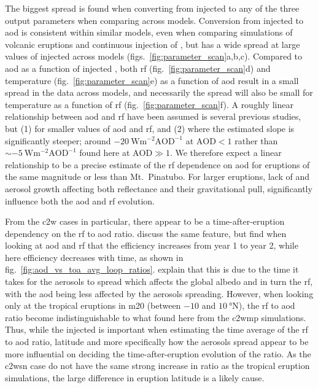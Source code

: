 \documentclass{ametsocV6.1}
\newcommand{\iso}[1][i]{{#1}njected \ce{SO2}}
\begin{document}
The biggest spread is found when converting from \iso{} to any of the three output
parameters when comparing across models. Conversion from \iso{} to \gls{aod} is
consistent within similar models, even when comparing simulations of volcanic eruptions
\citep{timmreck2010} and continuous injection of  \citep{niemeier2015}, but has
a wide spread at large values of \iso{} across models
(figs.~\ref{fig:parameter_scan}a,b,c). Compared to \gls{aod} as a function of \iso{},
both \gls{rf} (fig.~\ref{fig:parameter_scan}d) and temperature
(fig.~\ref{fig:parameter_scan}e) as a function of \gls{aod} result in a small spread in
the data across models, and necessarily the spread will also be small for temperature as
a function of \gls{rf} (fig.~\ref{fig:parameter_scan}f). A roughly linear relationship
between \gls{aod} and \gls{rf} have been assumed is several previous studies, but (1)
for smaller values of \gls{aod} and \gls{rf}, and (2) where the estimated slope is
significantly steeper; around \(\SI{-20}{\watt\metre^{-2}\mathrm{AOD}^{-1}}\) at
\(\mathrm{AOD}<1\) rather than \(\sim\SI{-5}{\watt\metre^{-2}\mathrm{AOD}^{-1}}\) found
here at \(\mathrm{AOD}\gg1\). We therefore expect a linear relationship to be a precise
estimate of the \gls{rf} dependence on \gls{aod} for eruptions of the same magnitude or
less than Mt.\ Pinatubo. For larger eruptions, lack of  and aerosol growth
affecting both reflectance and their gravitational pull, significantly influence both
the \gls{aod} and \gls{rf} evolution.

From the \gls{c2w} cases in particular, there appear to be a time-after-eruption
dependency on the \gls{rf} to \gls{aod} ratio. \citet{marshall2020} discuss the same
feature, but find when looking at \gls{aod} and \gls{rf} that the efficiency increases
from year 1 to year 2, while here efficiency decreases with time, as shown in
fig.~\ref{fig:aod_vs_toa_avg_loop_ratios}. \citet{marshall2020} explain that this is due
to the time it takes for the aerosols to spread which affects the global albedo and in
turn the \gls{rf}, with the \gls{aod} being less affected by the aerosols spreading.
However, when looking only at the tropical eruptions in \gls{m20} (between \(-10\) and
\(\SI{10}{\degree\mathrm{N}}\)), the \gls{rf} to \gls{aod} ratio become
indistinguishable to what found here from the \gls{c2wmp} simulations. Thus, while the
\iso{} is important when estimating the time average of the \gls{rf} to \gls{aod} ratio,
latitude and more specifically how the aerosols spread appear to be more influential on
deciding the time-after-eruption evolution of the ratio. As the \gls{c2wsn} case do not
have the same strong increase in ratio as the tropical eruption simulations, the large
difference in eruption latitude is a likely cause.
\end{document}
